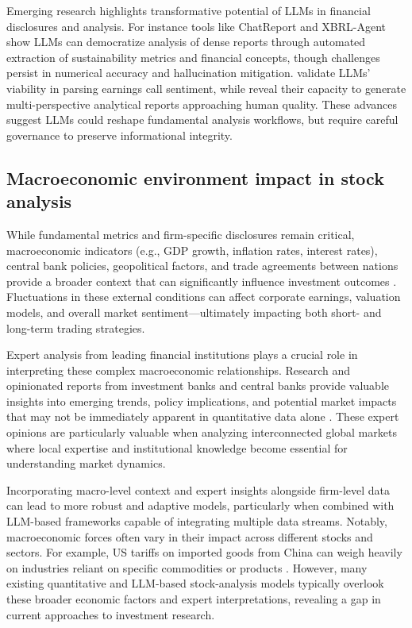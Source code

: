 Emerging research highlights transformative potential of LLMs in financial disclosures and analysis. For instance tools like ChatReport \cite{ni2023chatreport} and XBRL-Agent \cite{han2024xbrl} show LLMs can democratize analysis of dense reports through automated extraction of sustainability metrics and financial concepts, though challenges persist in numerical accuracy and hallucination mitigation. \cite{cook2023evaluating} validate LLMs’ viability in parsing earnings call sentiment, while \cite{goldsack2024facts} reveal their capacity to generate multi-perspective analytical reports approaching human quality. These advances suggest LLMs could reshape fundamental analysis workflows, but require careful governance to preserve informational integrity.

\subsection{Macroeconomic environment impact in stock analysis}
While fundamental metrics and firm-specific disclosures remain critical, macroeconomic indicators (e.g., GDP growth, inflation rates, interest rates), central bank policies, geopolitical factors, and trade agreements between nations provide a broader context that can significantly influence investment outcomes \cite{kwon2024large}. Fluctuations in these external conditions can affect corporate earnings, valuation models, and overall market sentiment—ultimately impacting both short- and long-term trading strategies.

Expert analysis from leading financial institutions plays a crucial role in interpreting these complex macroeconomic relationships. Research and opinionated reports from investment banks and central banks provide valuable insights into emerging trends, policy implications, and potential market impacts that may not be immediately apparent in quantitative data alone \cite{abaidoo2023inflation}. These expert opinions are particularly valuable when analyzing interconnected global markets where local expertise and institutional knowledge become essential for understanding market dynamics.

Incorporating macro-level context and expert insights alongside firm-level data can lead to more robust and adaptive models, particularly when combined with LLM-based frameworks capable of integrating multiple data streams. Notably, macroeconomic forces often vary in their impact across different stocks and sectors. For example, US tariffs on imported goods from China can weigh heavily on industries reliant on specific commodities or products \cite{nvidia2022q3}. However, many existing quantitative and LLM-based stock-analysis models typically overlook these broader economic factors and expert interpretations, revealing a gap in current approaches to investment research.